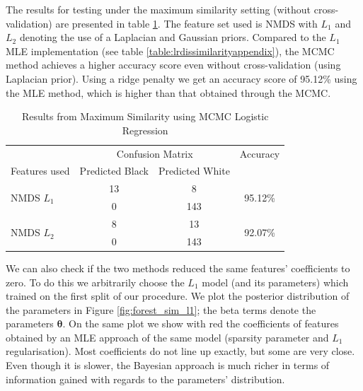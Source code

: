 The results for testing under the maximum similarity setting (without cross-validation) are presented in table \ref{table:bay_sim}. The feature set used is NMDS with $L_1$ and $L_2$ denoting the use of a Laplacian and Gaussian priors. Compared to the $L_1$ MLE implementation (see table \ref{table:lrdissimilarityappendix}), the MCMC method achieves a higher accuracy score even without cross-validation (using Laplacian prior). Using a ridge penalty we get an accuracy score of 95.12\% using the MLE method, which is higher than that obtained through the MCMC.

\begin{table}[!htb]
	\centering
	\caption{Results from Maximum Similarity using MCMC Logistic Regression}
	\label{table:bay_sim}
	\begin{tabular}{l c  c c}
		\toprule
		&\multicolumn{2}{c}{Confusion Matrix} & Accuracy\\
		Features used & Predicted Black&Predicted White&\\
		\midrule
		\multirow{2}{*}{NMDS $L_1$} &13 &8&\multirow{2}{*}{95.12\%}\\
		&	0&143&\\
		\cmidrule{2-3}
		\multirow{2}{*}{NMDS $L_2$} &8&13&\multirow{2}{*}{92.07\%}\\
		&	0&143&\\
		
		\bottomrule
	\end{tabular}
	
\end{table}

We can also check if the two methods reduced the same features' coefficients to zero. To do this we arbitrarily choose the $L_1$ model (and its parameters) which trained on the first split of our procedure. We plot the posterior distribution of the parameters in Figure \ref{fig:forest_sim_l1}; the beta terms denote the parameters $\bm{\theta}$. On the same plot we show with red the coefficients of features obtained by an MLE approach of the same model (sparsity parameter and $L_1$ regularisation). Most coefficients do not line up exactly, but some are very close. 
Even though it is slower, the Bayesian approach is much richer in terms of information gained with regards to the parameters' distribution. 

